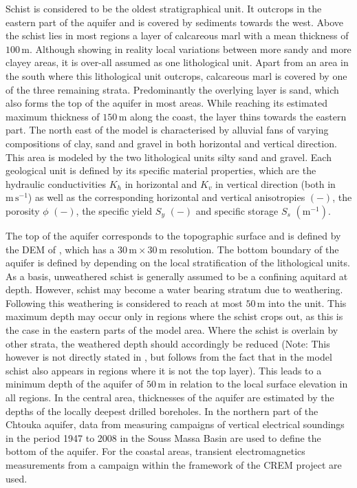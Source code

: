 Schist is considered to be the oldest stratigraphical unit. 
It outcrops in the eastern part of the aquifer and is covered by sediments towards the west. 
Above the schist lies in most regions a layer of calcareous marl with a mean thickness of $100 \, \textrm{m}$. 
Although showing in reality local variations between more sandy and more clayey areas, it is over-all assumed as one lithological unit. 
Apart from an area in the south where this lithological unit outcrops, calcareous marl is covered by one of the three remaining strata. 
Predominantly the overlying layer is sand, which also forms the top of the aquifer in most areas. 
While reaching its estimated maximum thickness of $150 \, \textrm{m}$ along the coast, the layer thins towards the eastern part. 
The north east of the model is characterised by alluvial fans of varying compositions of clay, sand and gravel in both horizontal and vertical direction. 
This area is modeled by the two lithological units silty sand and gravel. 
Each geological unit is defined by its specific material properties, which are the hydraulic conductivities $K_h$ in horizontal and $K_v$ in vertical direction (both in $\textrm{m} \, \textrm{s}^{-1}$) as well as the corresponding horizontal and vertical anisotropies $\left( - \right)$, the porosity $\phi$ $\left( - \right)$, the specific yield $S_y$ $\left( - \right)$ and specific storage $S_s$ $\left( \textrm{m}^{-1} \right)$.

The top of the aquifer corresponds to the topographic surface and is defined by the DEM of \textcite{NASA.SRTM1Arc}, which has a $30 \, \textrm{m} \times 30 \, \textrm{m}$ resolution. 
The bottom boundary of the aquifer is defined by \textcite{Horn.2021} depending on the local stratification of the lithological units. 
As a basis, unweathered schist is generally assumed to be a confining aquitard at depth. 
However, schist may become a water bearing stratum due to weathering. 
Following \textcite{McFadden.2005} this weathering is considered to reach at most $50 \, \textrm{m}$ into the unit. 
This maximum depth may occur only in regions where the schist crops out, as this is the case in the eastern parts of the model area. 
Where the schist is overlain by other strata, the weathered depth should accordingly be reduced (Note: This however is not directly stated in \textcite{Horn.2021}, but follows from the fact that in the model schist also appears in regions where it is not the top layer). 
This leads to a minimum depth of the aquifer of $50 \, \textrm{m}$ in relation to the local surface elevation in all regions. 
In the central area, thicknesses of the aquifer are estimated by the depths of the locally deepest drilled boreholes. 
In the northern part of the Chtouka aquifer, data from measuring campaigns of vertical electrical soundings in the period 1947 to 2008 in the Souss Massa Basin are used to define the bottom of the aquifer. 
For the coastal areas, transient electromagnetics measurements \parencite{Kalberkamp.2021} from a campaign within the framework of the CREM project are used.

